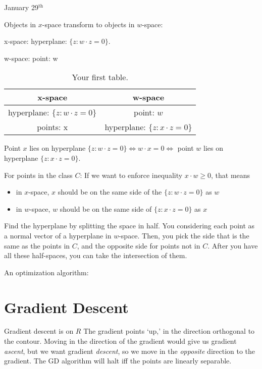 January 29$^\text{th}$


Objects in $x$-space transform to objects in $w$-space:



x-space: hyperplane: $\{z: w\cdot z = 0\}$.

w-space: point: w

\begin{table}[h!]
  \begin{center}
    \caption{Your first table.}
    \label{tab:table1}
    \begin{tabular}{|c|c|} %
    \hline
      \textbf{x-space} & \textbf{w-space} \\
      \hline
      hyperplane: $\{z : w \cdot z = 0\}$ & point: $w$\\
      points: x & hyperplane: $\{z: x \cdot z = 0\}$ \\
      \hline
    \end{tabular}
  \end{center}
\end{table}

Point $x$ lies on hyperplane $\{z : w \cdot z = 0\} \Leftrightarrow w \cdot x = 0\Leftrightarrow $ point $w$ lies on hyperplane $\{z : x \cdot z = 0\}$.

For points in the class $C$:
If we want to enforce inequality $x \cdot w \geq 0$, that means
\begin{itemize}
    \item in $x$-space, $x$ should be on the same side of the $\{z : w \cdot z = 0\}$ as $w$
    \item in $w$-space, $w$ should be on the same side of $\{z: x \cdot z = 0\}$ as $x$
\end{itemize}


Find the hyperplane by splitting the space in half. 
You considering each point as a normal vector of a hyperplane in $w$-space.
Then, you pick the side that is the same as the points in $C$, and the opposite side for points not in $C$.
After you have all these half-spaces, you can take the intersection of them.


An optimization algorithm: 

\section{Gradient Descent}
Gradient descent is on $R$
The gradient points `up,' in the direction orthogonal to the contour.
Moving in the direction of the gradient would give us gradient \textit{ascent}, but we want gradient \textit{descent}, so we move in the \textit{opposite} direction to the gradient.
The GD algorithm will halt iff the points are linearly separable.

